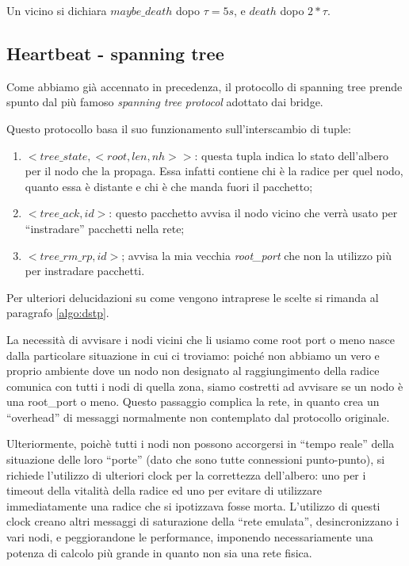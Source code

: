 \documentclass[italian]{memoir}
\begin{document}
Un vicino si dichiara $maybe\_death$ dopo $\tau = 5s$, e $death$ dopo $2*\tau$.

\subsection{Heartbeat - spanning tree}
Come abbiamo già accennato in precedenza, il protocollo di spanning tree prende spunto dal più famoso \textit{spanning tree protocol} adottato dai bridge. 

Questo protocollo basa il suo funzionamento sull'interscambio di tuple:
\begin{enumerate}
\item $<tree\_state,<root,len,nh>>$: questa tupla indica lo stato dell'albero per il nodo che la propaga. Essa infatti contiene chi è la radice per quel nodo, quanto essa è distante e chi è che manda fuori il pacchetto;
\item $<tree\_ack, id>$: questo pacchetto avvisa il nodo vicino che verrà usato per ``instradare'' pacchetti nella rete;
\item $<tree\_rm\_rp, id>$; avvisa la mia vecchia \textit{root\_port} che non la utilizzo più per instradare pacchetti.
\end{enumerate}
Per ulteriori delucidazioni su come vengono intraprese le scelte si rimanda al paragrafo \ref{algo:dstp}.

La necessità di avvisare i nodi vicini che li usiamo come root port o meno nasce dalla particolare situazione in cui ci troviamo: poiché non abbiamo un vero e proprio ambiente dove un nodo non designato al raggiungimento della radice comunica con tutti i nodi di quella zona, siamo costretti ad avvisare se un nodo è una root\_port o meno. Questo passaggio complica la rete, in quanto crea un ``overhead'' di messaggi normalmente non contemplato dal protocollo originale.

Ulteriormente, poichè tutti i nodi non possono accorgersi in ``tempo reale'' della situazione delle loro ``porte'' (dato che sono tutte connessioni punto-punto), si richiede l'utilizzo di ulteriori clock per la correttezza dell'albero: uno per i timeout della vitalità della radice ed uno per evitare di utilizzare immediatamente una radice che si ipotizzava fosse morta. L'utilizzo di questi clock creano altri messaggi di saturazione della ``rete emulata'', desincronizzano i vari nodi, e peggiorandone le performance, imponendo necessariamente una potenza di calcolo più grande in quanto non sia una rete fisica.
\end{document}
